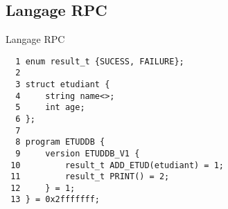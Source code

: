 \section{\sectitle}
\begin{frame}[containsverbatim]{\sectitle}
    \def\subsectitle{Langage RPC}
    \subsection{\subsectitle}
    \begin{exampleblock}{\subsectitle}
        \begin{verbatim}
  1 enum result_t {SUCESS, FAILURE};
  2 
  3 struct etudiant {
  4     string name<>;
  5     int age;
  6 };
  7 
  8 program ETUDDB {
  9     version ETUDDB_V1 {
 10         result_t ADD_ETUD(etudiant) = 1;
 11         result_t PRINT() = 2;
 12     } = 1;
 13 } = 0x2fffffff;
        \end{verbatim}
    \end{exampleblock}
\end{frame}


\def\sectitle{Génération des données externes}
